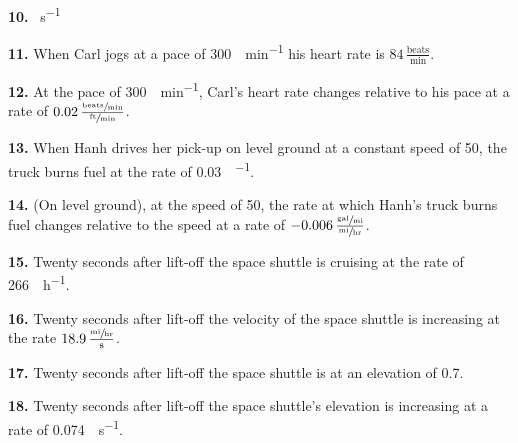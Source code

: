\documentclass[12pt,]{book}
\theoremstyle{plain}
\theoremstyle{definition}
\numberwithin{equation}{section}
\begin{document}
                \par\smallskip
\noindent\textbf{10.}\quad{}
                    \si{\mile\per\second}%

                \par\smallskip
\noindent\textbf{11.}\quad{}
                    When Carl jogs at a pace of \SI{300}{\foot\per\minute} his heart rate is \(84\,\frac{\text{beats}}{\text{min}}\).%

                \par\smallskip
\noindent\textbf{12.}\quad{}
                    At the pace of \SI{300}{\foot\per\minute}, Carl's heart rate changes relative to his pace at a rate of \(0.02\,\frac{\sfrac{\text{beats}}{\text{min}}}{\sfrac{\text{ft}}{\text{min}}}\).%

                \par\smallskip
\noindent\textbf{13.}\quad{}
                    When Hanh drives her pick-up on level ground at a constant speed of \SI{50}{\mileperhour}, the truck burns fuel at the rate of \SI{0.03}{\gallon\per\mile}.%

                \par\smallskip
\noindent\textbf{14.}\quad{}
                    (On level ground), at the speed of \SI{50}{\mileperhour}, the rate at which Hanh's truck burns fuel changes relative to the speed at a rate of \(-0.006\,\frac{\sfrac{\text{gal}}{\text{mi}}}{\sfrac{\text{mi}}{\text{hr}}}\).%

                \par\smallskip
\noindent\textbf{15.}\quad{}
                    Twenty seconds after lift-off the space shuttle is cruising at the rate of \SI{266}{\mile\per\hour}.%

                \par\smallskip
\noindent\textbf{16.}\quad{}
                    Twenty seconds after lift-off the velocity of the space shuttle is increasing at the rate \(18.9\,\frac{\sfrac{\text{mi}}{\text{hr}}}{\text{s}}\).%

                \par\smallskip
\noindent\textbf{17.}\quad{}                    
                    Twenty seconds after lift-off the space shuttle is at an elevation of \SI{0.7}{\mile}.%

                \par\smallskip
\noindent\textbf{18.}\quad{}
                    Twenty seconds after lift-off the space shuttle's elevation is increasing at a rate of \SI{0.074}{\mile\per\second}.%
\end{document}
